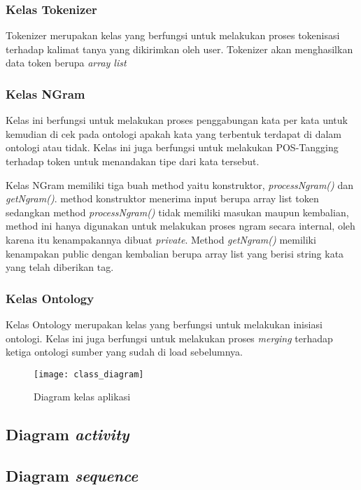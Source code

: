 \subsubsection{Kelas Tokenizer}
Tokenizer merupakan kelas yang berfungsi untuk melakukan proses tokenisasi terhadap kalimat tanya yang dikirimkan oleh user. Tokenizer akan menghasilkan data token berupa \emph{array list}
\subsubsection{Kelas NGram}
Kelas ini berfungsi untuk melakukan proses penggabungan kata per kata untuk kemudian di cek pada ontologi apakah kata yang terbentuk terdapat di dalam ontologi atau tidak. Kelas ini juga berfungsi untuk melakukan POS-Tangging terhadap token untuk menandakan tipe dari kata tersebut.

Kelas NGram memiliki tiga buah method yaitu konstruktor, \emph{processNgram()} dan \emph{getNgram()}. method konstruktor menerima input berupa array list token sedangkan method \emph{processNgram()} tidak memiliki masukan maupun kembalian, method ini hanya digunakan untuk melakukan proses ngram secara internal, oleh karena itu kenampakannya dibuat \emph{private}. Method \emph{getNgram()} memiliki kenampakan public dengan kembalian berupa array list yang berisi string kata yang telah diberikan tag.

\subsubsection{Kelas Ontology}
Kelas Ontology merupakan kelas yang berfungsi untuk melakukan inisiasi ontologi. Kelas ini juga berfungsi untuk melakukan proses \emph{merging} terhadap ketiga ontologi sumber yang sudah di load sebelumnya.


\begin{figure}[ht]
    \centering
    \texttt{[image: class\_diagram]}
    \caption{Diagram kelas aplikasi}
    \label{fig:class_diagram}
\end{figure}

\subsection{Diagram \emph{activity}}
\subsection{Diagram \emph{sequence}}